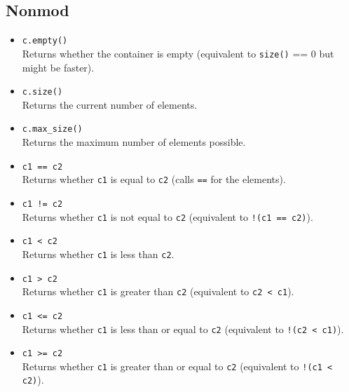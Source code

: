 \documentclass{report}
\begin{document}
\subsection{Nonmod}
\begin{itemize}
    \item \texttt{c.empty()} \\
          Returns whether the container is empty (equivalent to \texttt{size()} == 0 but might be faster).
          
    \item \texttt{c.size()} \\
          Returns the current number of elements.
          
    \item \texttt{c.max\_size()} \\
          Returns the maximum number of elements possible.
          
    \item \texttt{c1 == c2} \\
          Returns whether \texttt{c1} is equal to \texttt{c2} (calls \texttt{==} for the elements).
          
    \item \texttt{c1 != c2} \\
          Returns whether \texttt{c1} is not equal to \texttt{c2} (equivalent to \texttt{!(c1 == c2)}).
          
    \item \texttt{c1 < c2} \\
          Returns whether \texttt{c1} is less than \texttt{c2}.
          
    \item \texttt{c1 > c2} \\
          Returns whether \texttt{c1} is greater than \texttt{c2} (equivalent to \texttt{c2 < c1}).
          
    \item \texttt{c1 <= c2} \\
          Returns whether \texttt{c1} is less than or equal to \texttt{c2} (equivalent to \texttt{!(c2 < c1)}).
          
    \item \texttt{c1 >= c2} \\
          Returns whether \texttt{c1} is greater than or equal to \texttt{c2} (equivalent to \texttt{!(c1 < c2)}).
      \end{itemize}

      \pagebreak 
\end{document}
